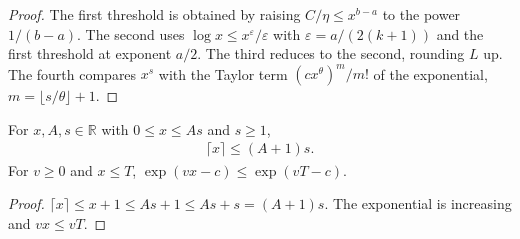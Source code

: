 \begin{proof}\leanok
    The first threshold is obtained by raising $C/\eta\le x^{b-a}$ to the
    power $1/(b-a)$. The second uses $\log x\le x^\varepsilon/\varepsilon$ with
    $\varepsilon=a/(2(k+1))$ and the first threshold at exponent $a/2$. The
    third reduces to the second, rounding $L$ up. The fourth compares $x^s$ with
    the Taylor term $(cx^\theta)^m/m!$ of the exponential, $m=\lfloor s/\theta\rfloor+1$.
\end{proof}

\begin{lemma}
    \label{thm:homogeneous_ceiling_bound}
    \leanok
    For $x,A,s\in\mathbb R$ with $0\le x\le As$ and $s\ge1$,
    \begin{align}
        \lceil x\rceil\le(A+1)s.
        \label{eq:homogeneous_ceiling_bound}
    \end{align}
    For $v\ge0$ and $x\le T$, $\exp(vx-c)\le\exp(vT-c)$.
\end{lemma}

\begin{proof}\leanok
    $\lceil x\rceil\le x+1\le As+1\le As+s=(A+1)s$. The exponential is
    increasing and $vx\le vT$.
\end{proof}
